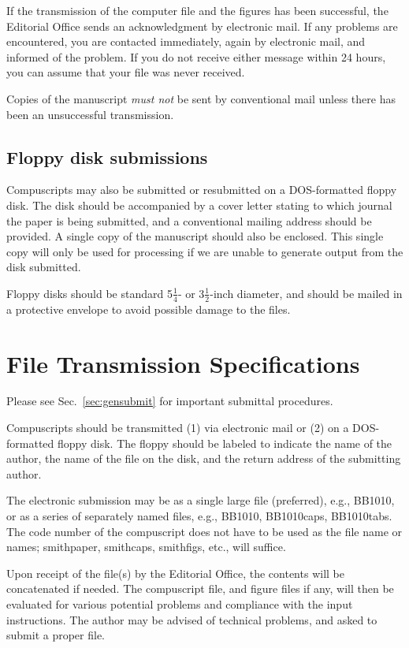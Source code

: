 If the transmission of the computer file and the figures has been
successful, the Editorial Office sends an acknowledgment by electronic
mail. If any problems are encountered, you are contacted immediately,
again by electronic mail, and informed of the problem. If you do not
receive either message within 24 hours, you can assume that your file
was never received.

Copies of the manuscript {\em must not\/} be sent by conventional mail
unless there has been an unsuccessful transmission. 

\subsection{Floppy disk submissions}

Compuscripts may also be submitted or resubmitted on a DOS-formatted floppy
disk. The disk should be accompanied by a cover letter stating to which
journal the paper is being submitted, and a conventional mailing address
should be provided. A single copy of the manuscript should also be
enclosed. This single copy will only be used for processing if we are
unable to generate output from the disk submitted.

Floppy disks should be standard 5$\frac14$- or 3$\frac12$-inch diameter,
and should be mailed in a protective envelope to avoid possible damage to
the files.  

\section{File Transmission Specifications}
\label{sec:filesubmit}

Please see Sec.\ \ref{sec:gensubmit} for important submittal procedures.

Compuscripts should be transmitted (1) via electronic mail or (2) on a
DOS-formatted floppy disk. The floppy should be labeled to indicate the
name of the author, the name of the file on the disk, and the return
address of the submitting author.

The electronic submission may be as a single large file (preferred), e.g.,
BB1010, or as a series of separately named files, e.g., BB1010, BB1010caps,
BB1010tabs. The code number of the compuscript does not have to be used as
the file name or names; smithpaper, smithcaps, smithfigs, etc., will
suffice.

Upon receipt of the file(s) by the Editorial Office, the contents will be
concatenated if needed. The compuscript file, and figure files if any, 
will then be evaluated for various potential problems and compliance with
the input instructions.  The author may be advised of technical problems,
and asked to submit a proper file.

